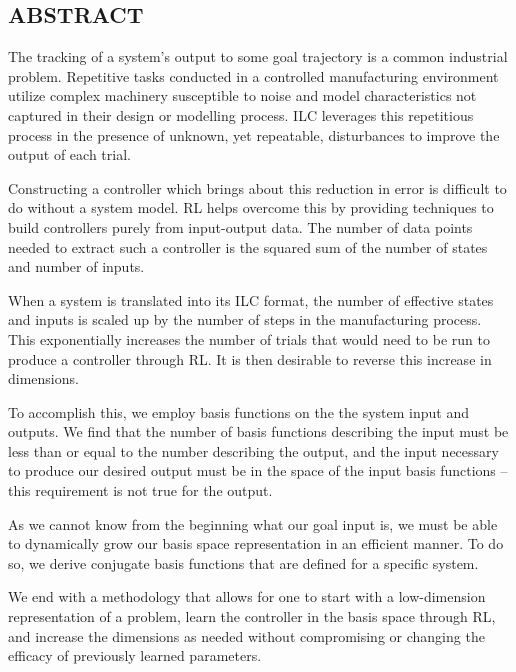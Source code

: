 \pagestyle{plain}
\begin{center}


\section*{ABSTRACT}


\end{center}
The tracking of a system's output to some goal trajectory is a common industrial problem. Repetitive tasks conducted in a controlled manufacturing environment utilize complex machinery susceptible to noise and model characteristics not captured in their design or modelling process. \ac{ILC} leverages this repetitious process in the presence of unknown, yet repeatable, disturbances to improve the output of each trial.

Constructing a controller which brings about this reduction in error is difficult to do without a system model. \ac{RL} helps overcome this by providing techniques to build controllers purely from input-output data. The number of data points needed to extract such a controller is the squared sum of the number of states and number of inputs.

When a system is translated into its ILC format, the number of effective states and inputs is scaled up by the number of steps in the manufacturing process. This exponentially increases the number of trials that would need to be run to produce a controller through RL. It is then desirable to reverse this increase in dimensions.

To accomplish this, we employ basis functions on the the system input and outputs. We find that the number of basis functions describing the input must be less than or equal to the number describing the output, and the input necessary to produce our desired output must be in the space of the input basis functions -- this requirement is not true for the output.

As we cannot know from the beginning what our goal input is, we must be able to dynamically grow our basis space representation in an efficient manner. To do so, we derive conjugate basis functions that are defined for a specific system.

We end with a methodology that allows for one to start with a low-dimension representation of a problem, learn the controller in the basis space through RL, and increase the dimensions as needed without compromising or changing the efficacy of previously learned parameters.

\cleardoublepage%